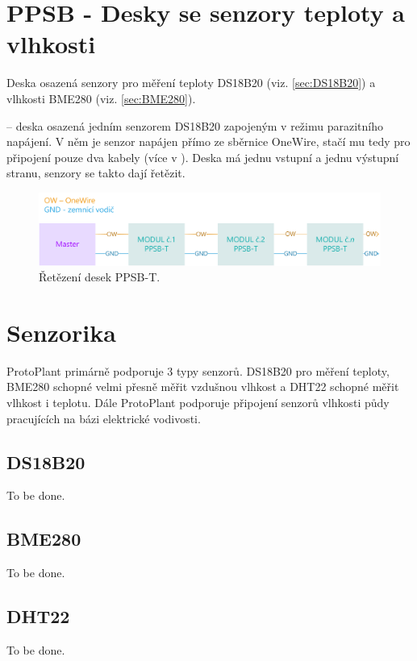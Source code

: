 \section{PPSB - Desky se senzory teploty a vlhkosti}
Deska osazená senzory pro měření teploty DS18B20 (viz. \autoref{sec:DS18B20}) a vlhkosti BME280 (viz. \autoref{sec:BME280}). 

\noindent{}
-- deska osazená jedním senzorem DS18B20 zapojeným v režimu parazitního napájení.
V něm je senzor napájen přímo ze sběrnice OneWire, stačí mu tedy pro připojení pouze dva kabely (více v \cite{DS18B20}).
Deska má jednu vstupní a jednu výstupní stranu, senzory se takto dají řetězit.

\begin{figure}[h]
    \centering
   \includegraphics[width=\textwidth]{img/HARDWARE/PPSB-T.png}
   \caption{Řetězení desek PPSB-T.}
   \label{fig:PPSB-T_wiring}
\end{figure}

\noindent{}

\noindent{}

\section{Senzorika}
ProtoPlant primárně podporuje 3 typy senzorů. 
DS18B20 pro měření teploty, BME280 schopné velmi přesně měřit vzdušnou vlhkost a DHT22 schopné měřit vlhkost i teplotu.
Dále ProtoPlant podporuje připojení senzorů vlhkosti půdy pracujících na bázi elektrické vodivosti.

\subsection{DS18B20}
\label{sec:DS18B20}
To be done.

\subsection{BME280}
\label{sec:BME280}
To be done.

\subsection{DHT22}
\label{sec:DHT22}
To be done.

\newpage